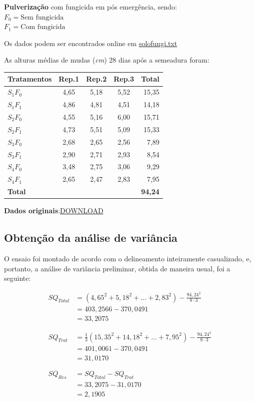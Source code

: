\documentclass[
]{article}
\begin{document}
\textbf{Pulverização} com fungicida em pós emergência, sendo:\\
\(F_0 = \text{Sem fungicida}\)\\
\(F_1 = \text{Com fungicida}\)

Os dados podem ser encontrados online em
\href{https://raw.githubusercontent.com/arpanosso/ExpAgr_2020/master/dados/solofungi.txt}{solofungi.txt}

As alturas médias de mudas (\emph{cm}) \(28\) dias após a semeadura
foram:

\begin{longtable}[]{@{}lcccr@{}}
\toprule\noalign{}
Tratamentos & Rep.1 & Rep.2 & Rep.3 & Total \\
\midrule\noalign{}
\endhead
\bottomrule\noalign{}
\endlastfoot
\(S_1F_0\) & 4,65 & 5,18 & 5,52 & 15,35 \\
\(S_1F_1\) & 4,86 & 4,81 & 4,51 & 14,18 \\
\(S_2F_0\) & 4,55 & 5,16 & 6,00 & 15,71 \\
\(S_2F_1\) & 4,73 & 5,51 & 5,09 & 15,33 \\
\(S_3F_0\) & 2,68 & 2,65 & 2,56 & 7,89 \\
\(S_3F_1\) & 2,90 & 2,71 & 2,93 & 8,54 \\
\(S_4F_0\) & 3,48 & 2,75 & 3,06 & 9,29 \\
\(S_4F_1\) & 2,65 & 2,47 & 2,83 & 7,95 \\
\textbf{Total} & & & & \textbf{94,24} \\
\end{longtable}

\textbf{Dados
originais}:\href{https://github.com/arpanosso/experimentacao-agricola-unesp-fcav/raw/master/data/dados_altura_mudas.xlsx}{DOWNLOAD}

\subsection{Obtenção da análise de
variância}\label{obtenuxe7uxe3o-da-anuxe1lise-de-variuxe2ncia}

O ensaio foi montado de acordo com o delineamento inteiramente
casualizado, e, portanto, a análise de variância preliminar, obtida de
maneira usual, foi a seguinte:

\[
\begin{aligned}
SQ_{Total} &= (4,65^2+5,18^2+ \dots +2,83^2) - \frac{94,24^2}{8 \cdot 3} \\
           & = 403,2566 - 370,0491 \\
           &= 33,2075 \\
\\
\\
SQ_{Trat} &= \frac{1}{3}(15,35^2+14,18^2+ \dots +7,95^2) - \frac{94,24^2}{8 \cdot 3} \\
           & = 401,0061 - 370,0491 \\
           &= 31,0170 \\
\\
\\
SQ_{Res} &= SQ_{Total} - SQ_{Trat} \\
           & = 33,2075 - 31,0170 \\
           &= 2,1905
\end{aligned}
\]
\end{document}
